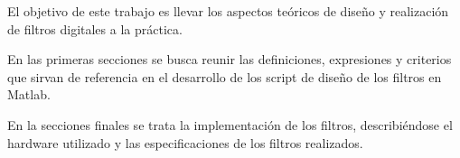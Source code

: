 \documentclass[informe.tex]{subfiles}
\begin{document}
\justify
El objetivo de este trabajo es llevar los aspectos teóricos de diseño y realización de filtros digitales a la práctica.\newline

En las primeras secciones se busca reunir las definiciones, expresiones y criterios que sirvan de referencia en el desarrollo de los script de diseño de los filtros en Matlab.\newline

En la secciones finales se trata la implementación de los filtros, describiéndose el hardware utilizado y las especificaciones de los filtros realizados.
\end{document}
